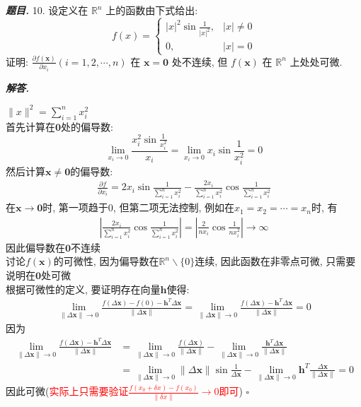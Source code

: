 \documentclass[10pt, a4paper, oneside]{ctexart}
\newcommand{\norm}[1]{\| #1 \|}
\newenvironment{problem}{\begin{framed}\par\noindent\textbf{\textit{题目. }}}{\end{framed}\par}
\newenvironment{solution}{%
  \par\noindent\textbf{\textit{解答. }}\ignorespaces
}{%
  \hfill\ensuremath{\square}\par %
}
\begin{document}
\begin{problem}
10. 设定义在 $\mathbb{R}^n$ 上的函数由下式给出:
$$
f(x)= \begin{cases}|x|^2 \sin \frac{1}{|x|^2}, & |x| \neq 0 \\ 0, & |x|=0\end{cases}
$$
证明: $\frac{{\partial} f(\boldsymbol{x})}{\partial x_i}(i=1,2, \cdots, n)$ 在 $\boldsymbol{x}=\mathbf{0}$ 处不连续, 但 $f(\boldsymbol{x})$ 在 $\mathbb{R}^n$ 上处处可微.
\end{problem}
\begin{solution}
$\norm{x}^2=\sum_{i=1}^n x_i^2$\\
首先计算在$\bm{0}$处的偏导数:
$$\lim_{x_i\to 0}\frac{x_i^2 \sin \frac{1}{x_i^2}}{x_i}=\lim_{x_i\to 0}x_i\sin \frac{1}{x_i^2}=0$$
然后计算$\bm{x}\neq\bm{0}$的偏导数:
\begin{align*}
    \frac{\partial f}{\partial x_i}=2x_i\sin \frac{1}{\sum_{i=1}^n x_i^2}-\frac{2x_i}{\sum_{i=1}^n x_i^2}\cos\frac{1}{\sum_{i=1}^n x_i^2}
\end{align*}
在$\bm{x}\to\bm{0}$时, 第一项趋于$0$, 但第二项无法控制, 例如在$x_1=x_2=\cdots=x_n$时, 有
\begin{align*}
    |\frac{2x_i}{\sum_{i=1}^n x_i^2}\cos\frac{1}{\sum_{i=1}^n x_i^2}|=|\frac{2}{nx_i}\cos\frac{1}{nx_i^2}|\to\infty
\end{align*}
因此偏导数在$\bm{0}$不连续\\
讨论$f(\bm{x})$的可微性, 因为偏导数在$\mathbb{R}^n\backslash\{0\}$连续, 因此函数在非零点可微, 只需要说明在$\bm{0}$处可微\\
根据可微性的定义, 要证明存在向量$\bm{h}$使得:
\begin{align*}
    \lim_{\norm{\Delta\bm{ x}}\to 0}\frac{f(\Delta \bm{x})-f(0)-\bm{h}^T\Delta \bm{x}}{\norm{\Delta\bm{ x}}}=\lim_{\norm{\Delta\bm{ x}}\to 0}\frac{f(\Delta \bm{x})-\bm{h}^T\Delta \bm{x}}{\norm{\Delta\bm{ x}}}=0
\end{align*}
因为
\begin{align*}
    \lim_{\norm{\Delta\bm{ x}}\to 0}\frac{f(\Delta \bm{x})-\bm{h}^T\Delta \bm{x}}{\norm{\Delta\bm{ x}}}&=\lim_{\norm{\Delta\bm{ x}}\to 0}\frac{f(\Delta \bm{x})}{\norm{\Delta\bm{ x}}}-\lim_{\norm{\Delta\bm{ x}}\to 0}\frac{\bm{h}^T\Delta \bm{x}}{\norm{\Delta\bm{ x}}}\\
    &=\lim_{\norm{\Delta\bm{ x}}\to 0}\norm{\Delta\bm{ x}}\sin\frac{1}{\Delta\bm{ x}}- \lim_{\norm{\Delta\bm{ x}}\to 0}\bm{h}^T\frac{\Delta\bm{ x}}{\norm{\Delta\bm{ x}}}=0
\end{align*}
因此可微(\textcolor{red}{实际上只需要验证$\frac{f(x_0+\delta x)-f(x_0)}{\norm{\delta x}}\to 0$即可})
\end{solution}
\end{document}

